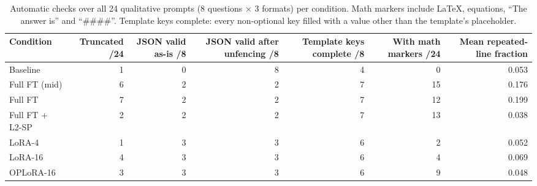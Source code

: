 \begin{table}[t]
\centering
\small
\caption{Automatic checks over all 24 qualitative prompts (8 questions × 3 formats) per condition. Math markers include LaTeX, equations, “The answer is” and “\#\#\#\#”. Template keys complete: every non-optional key filled with a value other than the template's placeholder.}
\label{tab:t1-autoflags}
\begin{tabular}{lrrrrrr}
\toprule
Condition & Truncated /24 & JSON valid as-is /8 & JSON valid after unfencing /8 & Template keys complete /8 & With math markers /24 & Mean repeated-line fraction \\
\midrule
Baseline & 1 & 0 & 8 & 4 & 0 & 0.053 \\
Full FT (mid) & 6 & 2 & 2 & 7 & 15 & 0.176 \\
Full FT & 7 & 2 & 2 & 7 & 12 & 0.199 \\
Full FT + L2-SP & 2 & 2 & 2 & 7 & 13 & 0.038 \\
LoRA-4 & 1 & 3 & 3 & 6 & 2 & 0.052 \\
LoRA-16 & 4 & 3 & 3 & 6 & 4 & 0.069 \\
OPLoRA-16 & 3 & 3 & 3 & 6 & 9 & 0.048 \\
\bottomrule
\end{tabular}
\end{table}
